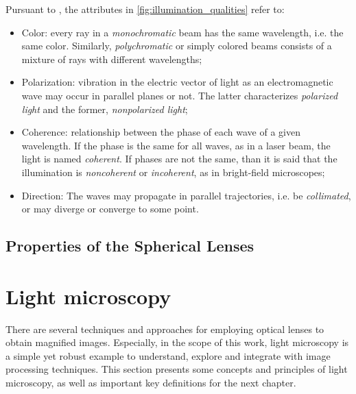 Pursuant to , the attributes in \autoref{fig:illumination_qualities} 
refer to:

\begin{itemize}
    \item Color: every ray in a \emph{monochromatic} beam has the same wavelength, i.e. the same color. Similarly, \emph{polychromatic} or simply colored beams consists of a mixture of rays with different wavelengths;
    
    \item Polarization: vibration in the electric vector of light as an electromagnetic wave may occur
    in parallel planes or not. The latter characterizes \emph{polarized light} and the former, \emph{nonpolarized light};
    
    \item Coherence: relationship between the phase of each wave of a given wavelength. If the phase is the same for all waves, as in a laser beam, the light is named \emph{coherent}. If phases are not the same, than it is said that the illumination is \emph{noncoherent} or \emph{incoherent}, as in bright-field microscopes;
    
    \item Direction: The waves may propagate in parallel trajectories, i.e. be \emph{collimated}, or may diverge or converge to some point.
    
\end{itemize}

\subsection{Properties of the Spherical Lenses}



\section{Light microscopy}
\label{sec:light_microscopy}

There are several techniques and approaches for employing optical lenses to obtain magnified images. Especially, in the scope of this work, light microscopy is a simple yet robust example to understand, explore and integrate with image processing techniques. This section presents some concepts and principles of light microscopy, as well as important key definitions for the next chapter.

